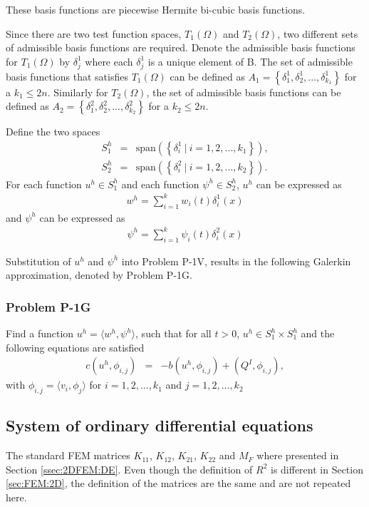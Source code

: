 \documentclass[../../main.tex]{subfiles}
\begin{document}
These basis functions are piecewise Hermite bi-cubic basis functions.

Since there are two test function spaces, $T_1(\Omega)$ and $T_2(\Omega)$, two different sets of admissible basis functions are required. Denote the admissible basis functions for $T_1(\Omega)$ by $\delta^1_j$ where each $\delta^1_j$ is a unique element of B. The set of admissible basis functions that satisfies $T_1(\Omega)$ can be defined as $A_1 = \left\{\delta^1_1, \delta^1_2,..., \delta^1_{k_1} \right\}$ for a $k_1 \leq 2n$. Similarly for $T_2(\Omega)$, the set of admissible basis functions can be defined as $A_2 = \left\{\delta^2_1, \delta^2_2,..., \delta^2_{k_2} \right\}$ for a $k_2 \leq 2n$.

Define the two spaces
\begin{eqnarray*}
	S^h_1 & = & \textrm{span}\left(\left\{\delta^1_i \ | \ i = 1,2,...,k_1 \right\} \right),\\
	S^h_2 & = & \textrm{span}\left(\left\{\delta^2_i \ | \ i = 1,2,...,k_2 \right\} \right).
\end{eqnarray*}
For each function $u^h \in S_1^h$ and each function $\psi^h \in S_2^h$, $u^h$ can be expressed as
\begin{eqnarray*}
	w^h = \sum_{i = 1}^{k} w_i(t) \delta^1_{i}(x)
\end{eqnarray*} and $\psi^h$ can be expressed as
\begin{eqnarray*}
	\psi^h = \sum_{i = 1}^{k} \psi_i(t) \delta^2_{i}(x)
\end{eqnarray*}

Substitution of $u^h$ and $\psi^h$ into Problem P-1V, results in the following Galerkin approximation, denoted by Problem P-1G.

\subsubsection{Problem P-1G}
Find a function $u^h = \langle w^h, \psi^h \rangle$, such that for all $t>0$, $u^h \in S_1^h \times S_1^h$ and the following equations are satisfied
\begin{eqnarray}
	c(u^h,\phi_{i,j}) &=& -b(u^h,\phi_{i,j}) + (Q^I,\phi_{i,j}), \label{eq:P_Model:ProblemP1V1}
\end{eqnarray} with $\phi_{i,j} = \langle v_i, \phi_j \rangle$ for $i = 1,2,...,k_1$ and $j = 1,2,...,k_2$

\subsection{System of ordinary differential equations}\label{plate_fem_g}
The standard FEM matrices $K_{11}$, $K_{12}$, $K_{21}$, $K_{22}$ and $M_F$ where presented in Section \ref{ssec:2DFEM:DE}. Even though the definition of $R^2$ is different in Section \ref{sec:FEM:2D}, the definition of the matrices are the same and are not repeated here.
\end{document}
